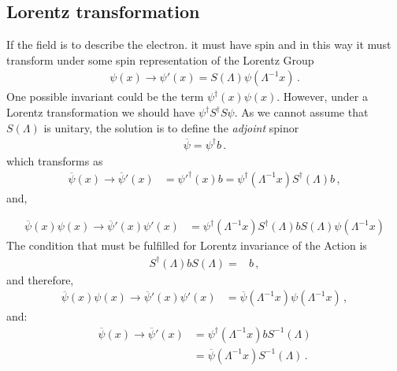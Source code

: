 \subsection{Lorentz transformation}

If the field is to describe the electron. it must have spin and in this way it must transform under some spin representation of the Lorentz Group
\begin{align}
  \psi(x)\to \psi'(x)=S(\Lambda)\psi\left(\Lambda^{-1}x\right)\,.
\end{align}
One possible invariant could be the term $\psi^\dagger(x)\psi(x)$. However, under a Lorentz transformation we should have $\psi^\dagger S^\dagger S\psi$. As we cannot assume that $S(\Lambda)$ is unitary, the solution is to define the \emph{adjoint} spinor
\begin{align}
  \overline{\psi}=\psi^\dagger b\,.
\end{align}
which transforms as
\begin{align}
  \overline{\psi}(x)\to  \overline{\psi}'(x)&=
{\psi'}^\dagger(x)b=
\psi^\dagger\left(\Lambda^{-1}x\right)S^\dagger(\Lambda)b\,,
\end{align}
and,

\begin{align}
  \overline{\psi}(x)\psi(x)\to  \overline{\psi}'(x)\psi'(x)&=
\psi^\dagger\left(\Lambda^{-1}x\right)S^\dagger(\Lambda)b S(\Lambda)\psi\left(\Lambda^{-1}x\right)
\end{align}
The condition that must be fulfilled for Lorentz invariance of the Action is 
\begin{align}
  \label{eq:ltrinscal}
  S^\dagger(\Lambda)bS(\Lambda)=&b\,,
\end{align}
and therefore, 
\begin{align}
  \overline{\psi}(x)\psi(x)\to  \overline{\psi}'(x)\psi'(x)&=
\overline{\psi}\left(\Lambda^{-1}x\right)\psi\left(\Lambda^{-1}x\right)\,,
\end{align}
and:
\begin{align}
  \overline{\psi}(x)\to  \overline{\psi}'(x)&=
\psi^\dagger\left(\Lambda^{-1}x\right)b S^{-1}(\Lambda)\nonumber\\
&=\overline{\psi}\left(\Lambda^{-1}x\right)S^{-1}(\Lambda)\,.
\end{align}


